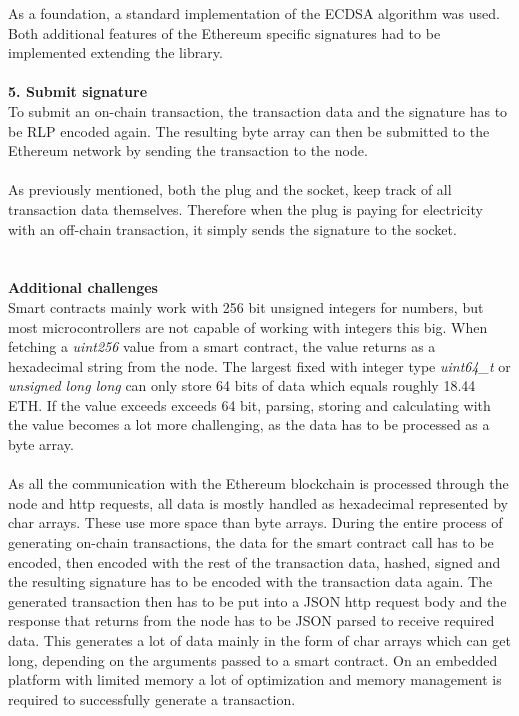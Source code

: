 As a foundation, a standard implementation of the ECDSA algorithm\cite{micro-ecc} was used.
Both additional features of the Ethereum specific signatures had to be implemented extending the library.
\\\\
\textbf{5. Submit signature}\\
To submit an on-chain transaction, the transaction data and the signature has to be RLP encoded again.
The resulting byte array can then be submitted to the Ethereum network by sending the transaction to the node.
\\\\
As previously mentioned, both the plug and the socket, keep track of all transaction data themselves.
Therefore when the plug is paying for electricity with an off-chain transaction, it simply sends the signature to the socket.
\\\\\\
\textbf{Additional challenges}\\
Smart contracts mainly work with 256 bit unsigned integers for numbers, but most microcontrollers are not capable of working with integers this big.
When fetching a \textit{uint256} value from a smart contract, the value returns as a hexadecimal string from the node.
The largest fixed with integer type \textit{uint64\_t} or \textit{unsigned long long} can only store 64 bits of data which equals roughly 18.44 ETH.
If the value exceeds exceeds 64 bit, parsing, storing and calculating with the value becomes a lot more challenging, as the data has to be processed as a byte array.
\\\\
As all the communication with the Ethereum blockchain is processed through the node and http requests, all data is mostly handled as hexadecimal represented by char arrays.
These use more space than byte arrays.
During the entire process of generating on-chain transactions, the data for the smart contract call has to be encoded, then encoded with the rest of the transaction data, hashed, signed and the resulting signature has to be encoded with the transaction data again.
The generated transaction then has to be put into a JSON http request body and the response that returns from the node has to be JSON parsed to receive required data.
This generates a lot of data mainly in the form of char arrays which can get long, depending on the arguments passed to a smart contract.
On an embedded platform with limited memory a lot of optimization and memory management is required to successfully generate a transaction.
\\\\
